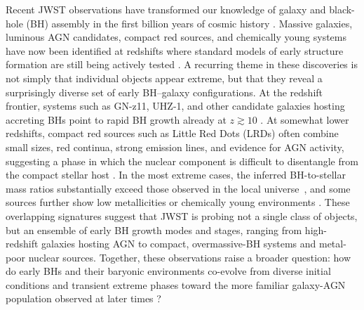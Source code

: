 \documentclass[twocolumn,trackchanges]{aastex701}
\begin{document}
 Recent JWST observations have transformed our knowledge of galaxy and black-hole (BH) assembly in the first billion years of cosmic history \citep[e.g.,][]{AdamoRev2025}. Massive galaxies, luminous AGN candidates, compact red sources, and chemically young systems have now been identified at redshifts where standard models of early structure formation are still being actively tested \citep[e.g.,][]{Finkelstein2022, Vanzella_LAP12023,Labbe2023Natur.616..266L,Boylan2023,Natarajan:2023UHZ1, KokorevLRD2024ApJ...968...38K,Scholtz2024A&A,Taylor2025, MaiolinoHebe2026arXiv}. A recurring theme in these discoveries is not simply that individual objects appear extreme, but that they reveal a surprisingly diverse set of early BH--galaxy configurations. At the redshift frontier, systems such as GN-z11, UHZ-1, and other candidate galaxies hosting accreting BHs point to rapid BH growth already at $z\gtrsim10$ \citep[e.g.,][]{Bogdan:2023UHZ1, GHZ9Napolitano2025ApJ...989...75N, Chavez2025arXivGHZ2,NaiduMoMz142026OJAp,Fabian2026MNRAS.547ag379F}. At somewhat lower redshifts, compact red sources such as Little Red Dots (LRDs) often combine small sizes, red continua, strong emission lines, and evidence for AGN activity, suggesting a phase in which the nuclear component is difficult to disentangle from the compact stellar host \citep[e.g.,][]{Matthee2023,Leung2024:LRD, Taylor2025,KocevskiLRD2025ApJ...986..126K,LabbeLRD2025ApJ...978...92L, KorberLRD2026arXiv}. 
In the most extreme cases, the inferred BH-to-stellar mass ratios substantially exceed those observed in the local universe~\citep[e.g.,][]{MaiolinoBH2024A&A,TripleBHUbler2026,QSO1Direct2026Natur}, and some sources further show low metallicities or chemically young environments \citep[e.g.,][]{QSO1PristineMaiolino2025,Cliff2026MNRAS,MaiolinoHebe2026arXiv,UblerHebe2026arXiv}. These overlapping signatures suggest that JWST is probing not a single class of objects, but an ensemble of early BH growth modes and stages, ranging from high-redshift galaxies hosting AGN to compact, overmassive-BH systems and metal-poor nuclear sources. Together, these observations raise a broader question: how do early BHs and their baryonic environments co-evolve from diverse initial conditions and transient extreme phases toward the more familiar galaxy-AGN population observed at later times \citep{Kormendy2013GalaxySMBH,Smith_Rev2019,Inayoshi:2020}?
\end{document}
